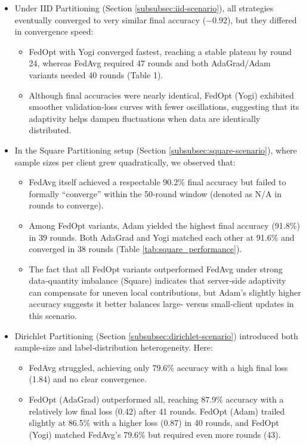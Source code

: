 \documentclass[11pt]{article}
\begin{document}
    \begin{itemize}
        \item Under IID Partitioning (Section \ref{subsubsec:iid-scenario}), all strategies eventually converged to very similar final accuracy ($-0.92$), but they differed in convergence speed:
        \begin{itemize}
            \item FedOpt with Yogi converged fastest, reaching a stable plateau by round 24, whereas FedAvg required 47 rounds and both AdaGrad/Adam variants needed 40 rounds (Table 1).
            \item Although final accuracies were nearly identical, FedOpt (Yogi) exhibited smoother validation‐loss curves with fewer oscillations, suggesting that its adaptivity helps dampen fluctuations when data are identically distributed.
        \end{itemize}
        \item In the Square Partitioning setup (Section \ref{subsubsec:square-scenario}), where sample sizes per client grew quadratically, we observed that:
        \begin{itemize}
            \item FedAvg itself achieved a respectable 90.2\% final accuracy but failed to formally “converge” within the 50‐round window (denoted as N/A in rounds to converge).
            \item Among FedOpt variants, Adam yielded the highest final accuracy (91.8\%) in 39 rounds. Both AdaGrad and Yogi matched each other at 91.6\% and converged in 38 rounds (Table \ref{tab:square_performance}).
            \item The fact that all FedOpt variants outperformed FedAvg under strong data‐quantity imbalance (Square) indicates that server‐side adaptivity can compensate for uneven local contributions, but Adam’s slightly higher accuracy suggests it better balances large‐ versus small‐client updates in this scenario.
        \end{itemize}
        \item Dirichlet Partitioning (Section \ref{subsubsec:dirichlet-scenario}) introduced both sample‐size and label‐distribution heterogeneity. Here:
        \begin{itemize}
            \item FedAvg struggled, achieving only 79.6\% accuracy with a high final loss (1.84) and no clear convergence.
            \item FedOpt (AdaGrad) outperformed all, reaching 87.9\% accuracy with a relatively low final loss (0.42) after 41 rounds. FedOpt (Adam) trailed slightly at 86.5\% with a higher loss (0.87) in 40 rounds, and FedOpt (Yogi) matched FedAvg’s 79.6\% but required even more rounds (43).

\end{itemize}
\end{itemize}
\end{document}

